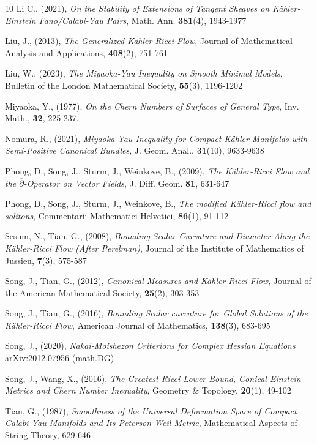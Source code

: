 \documentclass[12pt]{article}
\numberwithin{equation}{section}
\newcommand{\dbar}{\overline{\partial}}
\begin{document}
\begin{thebibliography}{10}
 Li C., (2021), 
\textit{On the Stability of Extensions of Tangent Sheaves on K\"ahler-Einstein Fano/Calabi-Yau Pairs},
Math. Ann. \textbf{381}(4), 1943-1977

 Liu, J., (2013), 
\textit{The Generalized K\"ahler-Ricci Flow}, Journal of Mathematical Analysis and Applications, \textbf{408}(2), 751-761

 Liu, W., (2023),
\textit{The Miyaoka-Yau Inequality on Smooth Minimal Models},
Bulletin of the London Mathematical Society, \textbf{55}(3), 1196-1202

 Miyaoka, Y., (1977), 
\textit{On the Chern Numbers of Surfaces of General Type},  Inv. Math., \textbf{32}, 225-237.

 Nomura, R., (2021), 
\textit{Miyaoka-Yau Inequality for Compact K\"ahler Manifolds with Semi-Positive Canonical Bundles}, 
J. Geom. Anal., \textbf{31}(10), 9633-9638

 Phong, D., Song, J., Sturm, J., Weinkove, B., (2009), \textit{The K\"ahler-Ricci Flow and the $\dbar$-Operator on Vector Fields}, J. Diff. Geom. \textbf{81}, 631-647

 Phong, D., Song, J., Sturm, J., Weinkove, B., \textit{The modified K\"ahler-Ricci flow and solitons}, Commentarii Mathematici Helvetici, \textbf{86}(1), 91-112

 Sesum, N., Tian, G., (2008), 
\textit{Bounding Scalar Curvature and Diameter Along the K\"ahler-Ricci Flow (After Perelman)}, 
Journal of the Institute of Mathematics of Jussieu, \textbf{7}(3), 575-587

 Song, J., Tian, G., (2012), 
\textit{Canonical Measures and K\"ahler-Ricci Flow}, 
Journal of the American Mathematical Society, \textbf{25}(2), 303-353

 Song, J., Tian, G., (2016), 
\textit{Bounding Scalar curvature for Global Solutions of the K\"ahler-Ricci Flow}, 
American Journal of Mathematics, \textbf{138}(3), 683-695

 Song, J., (2020), 
\textit{Nakai-Moishezon Criterions for Complex Hessian Equations}
arXiv:2012.07956 (math.DG)

 Song, J., Wang, X., (2016), 
\textit{The Greatest Ricci Lower Bound, Conical Einstein Metrics and Chern Number Inequality},
Geometry \& Topology, \textbf{20}(1), 49-102

 Tian, G., (1987), 
\textit{Smoothness of the Universal Deformation Space of Compact Calabi-Yau Manifolds and Its Peterson-Weil Metric}, 
Mathematical Aspects of String Theory, 629-646


\end{thebibliography}
\end{document}
